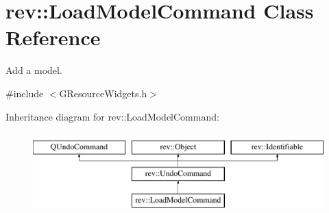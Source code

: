 \hypertarget{classrev_1_1_load_model_command}{}\section{rev\+::Load\+Model\+Command Class Reference}
\label{classrev_1_1_load_model_command}


Add a model.  




{\ttfamily \#include $<$G\+Resource\+Widgets.\+h$>$}

Inheritance diagram for rev\+::Load\+Model\+Command\+:\begin{figure}[H]
\begin{center}
\leavevmode
\includegraphics[height=3.000000cm]{classrev_1_1_load_model_command}
\end{center}
\end{figure}

